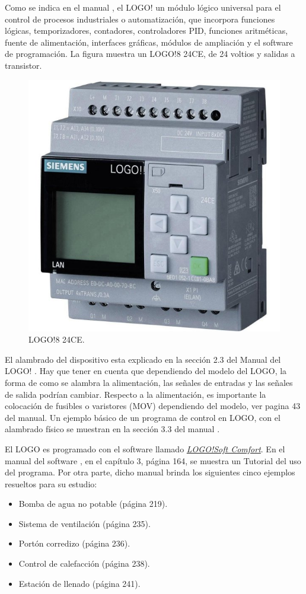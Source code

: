 Como se indica en el manual \cite{LOGO1}, el LOGO! un módulo lógico universal para el control de procesos industriales o automatización, que incorpora funciones lógicas, temporizadores, contadores, controladores PID, funciones aritméticas, fuente de alimentación, interfaces gráficas, módulos de ampliación y el software de programación. La figura muestra un LOGO!8 24CE, de 24 voltios y salidas a transistor.
\begin{figure}
	\centering
	\includegraphics[width=0.5\linewidth]{fig/Logo!8.jpg}
	\caption{LOGO!8 24CE.}
	\label{fig:logo8}
\end{figure}

 El alambrado del dispositivo esta explicado en la sección 2.3 del Manual del LOGO! \cite{LOGO1}. Hay que tener en cuenta que dependiendo del modelo del LOGO, la forma de como se alambra la alimentación, las señales de entradas y las señales de salida podrían cambiar. Respecto a la alimentación, es importante la colocación de fusibles o varistores (MOV) dependiendo del modelo, ver pagina 43 del manual.  Un ejemplo básico de un programa de control en LOGO, con el alambrado físico se muestran en la sección 3.3 del manual \cite{LOGO1}.
 
 El LOGO es programado con el software llamado \href{https://new.siemens.com/global/en/products/automation/systems/industrial/plc/logo/logo-software.html}{\textit{LOGO!Soft Comfort}}. En el manual del software \cite{LOGO2}, en el capítulo 3, página 164, se muestra un Tutorial del uso del programa. Por otra parte, dicho manual brinda los siguientes cinco ejemplos resueltos para su estudio:
 
\begin{itemize}
	\item Bomba de agua no potable (página 219).
	\item Sistema de ventilación (página 235).
	\item Portón corredizo (página 236).
	\item Control de calefacción (página 238).
	\item Estación de llenado (página 241).	
\end{itemize}
 
